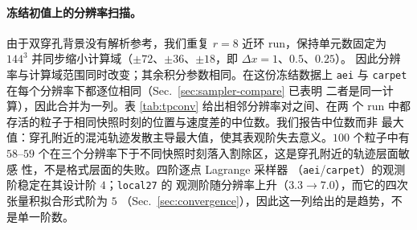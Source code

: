 \documentclass[11pt,UTF8]{ctexart}
\begin{document}
\paragraph{冻结初值上的分辨率扫描。}
由于双穿孔背景没有解析参考，我们重复 $r=8$ 近环 run，保持单元数固定为 $144^3$
并同步缩小计算域（$\pm72$、$\pm36$、$\pm18$，即 $\Delta x=1$、$0.5$、$0.25$）。
因此分辨率与计算域范围同时改变；其余积分参数相同。在这份冻结数据上 \texttt{aei} 与
\texttt{carpet} 在每个分辨率下都逐位相同（Sec.~\ref{sec:sampler-compare} 已表明
二者是同一计算），因此合并为一列。表 \ref{tab:tpconv} 给出相邻分辨率对之间、在两
个 run 中都存活的粒子于相同快照时刻的位置与速度差的中位数。我们报告中位数而非
最大值：穿孔附近的混沌轨迹发散主导最大值，使其表观阶失去意义。$100$ 个粒子中有
$58$--$59$ 个在三个分辨率下于不同快照时刻落入割除区，这是穿孔附近的轨迹层面敏感
性，不是格式层面的失败。四阶逐点 Lagrange 采样器
（\texttt{aei}/\texttt{carpet}）的观测阶稳定在其设计阶 $4$；\texttt{local27} 的
观测阶随分辨率上升（$3.3\to7.0$），而它的四次张量积拟合形式阶为 $5$
（Sec.~\ref{sec:convergence}），因此这一列给出的是趋势，不是单一阶数。

\begin{table}[h]
\centering
\caption{冻结 \texttt{GW150914} 双穿孔初值上的分辨率扫描：$r=8$ 环、$100$ 粒子、
$T=20\,M$，固定 $144^3$ 单元下 $\Delta x=1/0.5/0.25$。
$p_{\mathrm{med}}$：$\Delta x=0.5$ 与 $0.25$ 分辨率对之间的中位数位置差，相对
$\Delta x=1$ 与 $0.5$ 分辨率对之间的同一量的观测阶，统计每对 run 中都存活的
粒子；$p_v$：$t=20$ 时速度差的同样观测阶。分桶行：最小半径始终高于 $4$
（\emph{far}）或跌破 $4$（\emph{near}）粒子的中位数位置差，括号内为观测阶
$p$。\texttt{aei} 与 \texttt{carpet} 在三个分辨率下逐位一致，合并为一列。}
\label{tab:tpconv}
\end{table}
\end{document}
